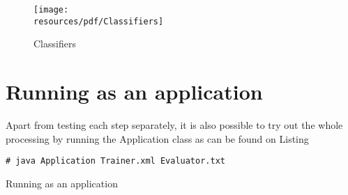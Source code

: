 \begin{figure}[!ht]
\centering
\texttt{[image: \\resources/pdf/Classifiers]}
\caption{Classifiers}
\label{fig:Classifiers}
\end{figure}

\section*{Running as an application}
Apart from testing each step separately, it is also possible to try out the
whole processing by running the Application class as can be found on Listing

\begin{listing}
\begin{verbatim}
# java Application Trainer.xml Evaluator.txt
\end{verbatim}
\caption{Running as an application}
\label{listing:application}
\end{listing}
